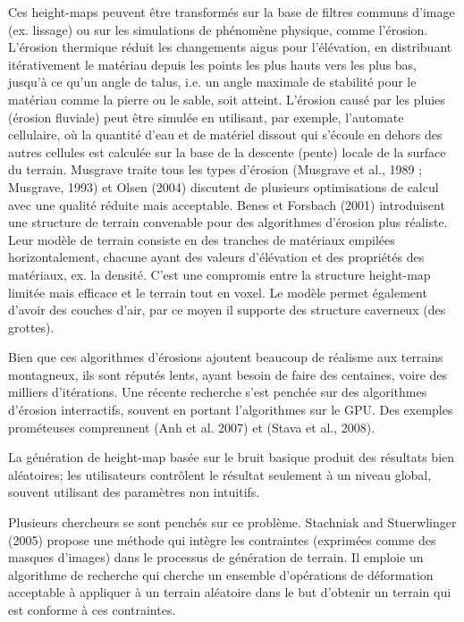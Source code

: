 \documentclass[11pt]{report}
\begin{document}
Ces height-maps peuvent être transformés sur la base de filtres  communs d'image (ex. lissage) ou sur les simulations de phénomène physique, comme l'érosion. L'érosion thermique réduit les changements aigus pour l'élévation, en distribuant itérativement le matériau depuis les points les plus hauts vers les plus bas, jusqu'à ce qu'un angle de talus, i.e. un angle maximale de stabilité pour le matériau comme la pierre ou le sable, soit atteint. L'érosion causé par les pluies (érosion fluviale) peut être simulée en utilisant, par exemple, l'automate cellulaire, où la quantité d'eau et de matériel dissout qui s'écoule en dehors des  autres cellules est calculée sur la base de la descente (pente) locale de la surface du terrain. Musgrave traite tous les types d'érosion (Musgrave et al., 1989 \cite{musgrave-89}; Musgrave, 1993) et Olsen (2004) discutent de plusieurs optimisations de calcul avec une qualité réduite mais acceptable. Benes et Forsbach (2001) introduisent une structure de terrain convenable pour des algorithmes d'érosion plus réaliste. Leur modèle de terrain consiste en des tranches de matériaux empilées horizontalement, chacune ayant des valeurs d'élévation et des propriétés des matériaux, ex. la densité. C'est une compromis entre la structure height-map limitée mais efficace et le terrain tout en voxel. Le modèle permet également d'avoir des couches d'air, par ce moyen il supporte des structure caverneux (des grottes). \newline

Bien que ces algorithmes d'érosions ajoutent beaucoup de réalisme aux terrains montagneux, ils sont réputés lents, ayant besoin de faire des centaines, voire des milliers d'itérations. Une récente recherche s'est penchée sur des algorithmes d'érosion interractifs, souvent en portant l'algorithmes sur le GPU. Des exemples prométeuses comprennent (Anh et al. 2007) et (Stava et al., 2008). \newline

La génération de height-map basée sur le bruit basique produit des résultats bien aléatoires; les utilisateurs contrôlent le résultat seulement à un niveau global, souvent utilisant des paramètres non intuitifs. 

Plusieurs chercheurs se sont penchés sur ce problème. Stachniak and Stuerwlinger (2005) propose une méthode qui intègre les contraintes (exprimées comme des masques d'images) dans le processus de génération de terrain. Il emploie un algorithme de recherche qui cherche un ensemble d'opérations de déformation acceptable à appliquer à un terrain aléatoire dans le but d'obtenir un terrain qui est conforme à ces contraintes. 
\end{document}
